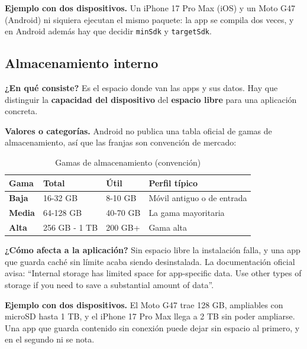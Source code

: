 \documentclass[11pt,a4paper]{article}
\newcommand{\code}[1]{\texttt{\color{navylight}#1}}
\newcommand{\campo}[1]{\textbf{\color{navy}#1}}
\begin{document}
	\campo{Ejemplo con dos dispositivos.} Un iPhone 17 Pro Max (iOS) y un Moto G47 (Android) ni siquiera ejecutan el mismo paquete: la app se compila dos veces, y en Android además hay que decidir \code{minSdk} y \code{targetSdk}.

	\subsection{Almacenamiento interno}

	\campo{¿En qué consiste?}
	Es el espacio donde van las apps y sus datos. Hay que distinguir la \textbf{capacidad del dispositivo} del \textbf{espacio libre} para una aplicación concreta.

	\campo{Valores o categorías.} Android no publica una tabla oficial de gamas de almacenamiento, así que las franjas son convención de mercado:

	\begin{table}[htbp]
		\centering
		\small
		\begin{tabularx}{\textwidth}{@{}l l l >{\RaggedRight\arraybackslash}X@{}}
			\toprule
			\rowcolor{primary}
			\textcolor{paper}{\sffamily\bfseries Gama} & \textcolor{paper}{\sffamily\bfseries Total} & \textcolor{paper}{\sffamily\bfseries Útil} & \textcolor{paper}{\sffamily\bfseries Perfil típico} \\
			\midrule
			\textbf{Baja} & 16-32 GB & 8-10 GB & Móvil antiguo o de entrada \\
			\rowcolor{soft}
			\textbf{Media} & 64-128 GB & 40-70 GB & La gama mayoritaria \\
			\textbf{Alta} & 256 GB - 1 TB & 200 GB+ & Gama alta \\
			\bottomrule
		\end{tabularx}
		\caption{Gamas de almacenamiento (convención)}
	\end{table}

	\campo{¿Cómo afecta a la aplicación?}
	Sin espacio libre la instalación falla, y una app que guarda caché sin límite acaba siendo desinstalada. La documentación oficial avisa: \enquote{Internal storage has limited space for app-specific data. Use other types of storage if you need to save a substantial amount of data}.

	\campo{Ejemplo con dos dispositivos.} El Moto G47 trae 128 GB, ampliables con microSD hasta 1 TB, y el iPhone 17 Pro Max llega a 2 TB sin poder ampliarse. Una app que guarda contenido sin conexión puede dejar sin espacio al primero, y en el segundo ni se nota.
\end{document}
